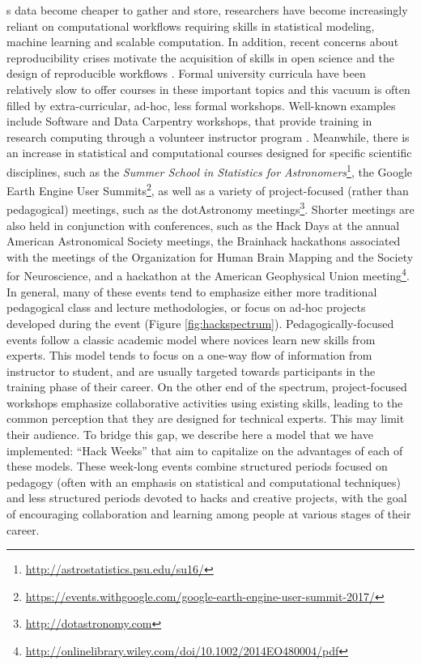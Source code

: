 \label{sec:introduction}
s data become cheaper to gather and store, researchers have become increasingly reliant on computational workflows requiring skills in statistical modeling, machine learning and scalable computation. In addition, recent concerns about reproducibility crises motivate the acquisition of skills in open science and the design of reproducible workflows \cite[e.g.][]{pashler2012,baker2016}.
Formal university curricula have been relatively slow to offer courses in these important topics and this vacuum is often filled by extra-curricular, ad-hoc, less formal workshops.
Well-known examples include Software and Data Carpentry workshops, that provide training in research computing through a volunteer instructor program \cite{b:wilson-swc-lessons-2016,teal2015data}.
Meanwhile, there is an increase in statistical and computational courses designed for specific scientific disciplines, such as the \textit{Summer School in Statistics for Astronomers}\footnote{\url{http://astrostatistics.psu.edu/su16/}}, the Google Earth Engine User Summits\footnote{\url{https://events.withgoogle.com/google-earth-engine-user-summit-2017/}}, as well as a variety of project-focused (rather than pedagogical) meetings, such as the dotAstronomy meetings\footnote{\url{http://dotastronomy.com}}.
Shorter meetings are also held in conjunction with conferences, such as the Hack Days at the annual American Astronomical Society meetings, the Brainhack hackathons associated with the meetings of the Organization for Human Brain Mapping and the Society for Neuroscience\cite{Cameron_Craddock2016-wc}, and a hackathon at the American Geophysical Union meeting\footnote{\url{http://onlinelibrary.wiley.com/doi/10.1002/2014EO480004/pdf}}.
In general, many of these events tend to emphasize either more traditional pedagogical class and lecture methodologies, or focus on ad-hoc projects developed during the event (Figure \ref{fig:hackspectrum}).
Pedagogically-focused events follow a classic academic model where novices learn new skills from experts. This model tends to focus on a one-way flow of information from instructor to student, and are usually targeted towards participants in the training phase of their career. On the other end of the spectrum, project-focused workshops emphasize collaborative activities using existing skills, leading to the common perception that they are designed for technical experts. This may limit their audience.
To bridge this gap, we describe here a model that we have implemented: ``Hack Weeks'' that aim to capitalize on the advantages of each of these models.
These week-long events combine structured periods focused on pedagogy (often with an emphasis on statistical and computational techniques) and less structured periods devoted to hacks and creative projects, with the goal of encouraging collaboration and learning among people at various stages of their career.
\renewcommand{\floatpagefraction}{.3}%
\renewcommand{\dblfloatpagefraction}{.3}%

